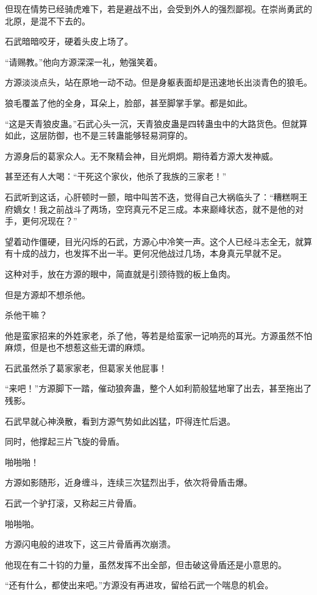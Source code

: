 \begin{this_body}
但现在情势已经骑虎难下，若是避战不出，会受到外人的强烈鄙视。在崇尚勇武的北原，是混不下去的。

石武暗暗咬牙，硬着头皮上场了。

“请赐教。”他向方源深深一礼，勉强笑着。

方源淡淡点头，站在原地一动不动。但是身躯表面却是迅速地长出淡青色的狼毛。

狼毛覆盖了他的全身，耳朵上，脸部，甚至脚掌手掌。都是如此。

“这是天青狼皮蛊。”石武心头一沉，天青狼皮蛊是四转蛊虫中的大路货色。但就算如此，这层防御，也不是三转蛊能够轻易洞穿的。

方源身后的葛家众人。无不聚精会神，目光炯炯。期待着方源大发神威。

甚至还有人大喝：“干死这个家伙，他杀了我族的三家老！”

石武听到这话，心肝顿时一颤，暗中叫苦不迭，觉得自己大祸临头了：“糟糕啊王府嫡女！我之前战斗了两场，空窍真元不足三成。本来巅峰状态，就不是他的对手，更何况现在？”

望着动作僵硬，目光闪烁的石武，方源心中冷笑一声。这个人已经斗志全无，就算有十成的战力，也发挥不出一半。更何况他战过几场，本身真元早就不足。

这种对手，放在方源的眼中，简直就是引颈待戮的板上鱼肉。

但是方源却不想杀他。

杀他干嘛？

他是蛮家招来的外姓家老，杀了他，等若是给蛮家一记响亮的耳光。方源虽然不怕麻烦，但是也不想惹这些无谓的麻烦。

石武虽然杀了葛家家老，但葛家关他屁事！

“来吧！”方源脚下一踏，催动狼奔蛊，整个人如利箭般猛地窜了出去，甚至拖出了残影。

石武早就心神涣散，看到方源气势如此凶猛，吓得连忙后退。

同时，他撑起三片飞旋的骨盾。

啪啪啪！

方源如影随形，近身缠斗，连续三次猛烈出手，依次将骨盾击爆。

石武一个驴打滚，又称起三片骨盾。

啪啪啪。

方源闪电般的进攻下，这三片骨盾再次崩溃。

他现在有二十钧的力量，虽然发挥不出全部，但击破这骨盾还是小意思的。

“还有什么，都使出来吧。”方源没有再进攻，留给石武一个喘息的机会。


\end{this_body}
